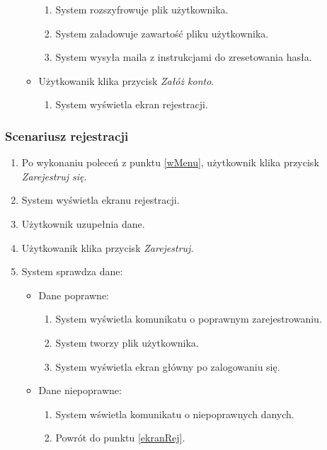 \documentclass[a4paper]{article}
\begin{document}
\begin{enumerate}
\begin{itemize}
\begin{enumerate}
            \item System rozszyfrowuje plik użytkownika.
            \item System załadowuje zawartość pliku użytkownika.
            \item System wysyła maila z instrukcjami do zresetowania hasła.
        \end{enumerate}
        \item Użytkowanik klika przycisk \textit{Załóż konto}.
        \begin{enumerate}
            \item System wyświetla ekran rejestracji.
        \end{enumerate}
    \end{itemize}
\end{enumerate}

\subsubsection{Scenariusz rejestracji}
\begin{enumerate}
    \item Po wykonaniu poleceń z punktu \ref{wMenu}, użytkownik klika przycisk \textit{Zarejestruj się}.
    \item System wyświetla ekranu rejestracji. \label{ekranRej}
    \item Użytkownik uzupełnia dane.
    \item Użytkowanik klika przycisk \textit{Zarejestruj}.
    \item System sprawdza dane:
    \begin{itemize}
        \item Dane poprawne:
        \begin{enumerate}
            \item System wyświetla  komunikatu o poprawnym zarejestrowaniu.
            \item System tworzy plik użytkownika.
            \item System wyświetla ekran główny po zalogowaniu się.
        \end{enumerate}
        \item Dane niepoprawne:
        \begin{enumerate}
            \item System wświetla komunikatu o niepoprawnych danych.
            \item Powrót do punktu \ref{ekranRej}.
        \end{enumerate}
    \end{itemize}
\end{enumerate}
\end{document}
